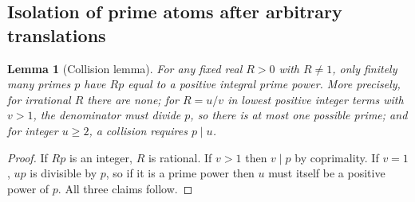 \documentclass[11pt]{article}
\newtheorem{lemma}[theorem]{Lemma}
\theoremstyle{remark}\newtheorem{remark}[theorem]{Remark}
\begin{document}
\subsection{Isolation of prime atoms after arbitrary translations}
\begin{lemma}[Collision lemma]\label{lem:collision}
For any fixed real $R>0$ with $R\ne1$, only finitely many primes $p$ have $Rp$ equal to a positive integral prime power. More precisely, for irrational $R$ there are none; for $R=u/v$ in lowest positive integer terms with $v>1$, the denominator must divide $p$, so there is at most one possible prime; and for integer $u\ge2$, a collision requires $p\mid u$.
\end{lemma}
\begin{proof}
If $Rp$ is an integer, $R$ is rational. If $v>1$ then $v\mid p$ by coprimality. If $v=1$, $up$ is divisible by $p$, so if it is a prime power then $u$ must itself be a positive power of $p$. All three claims follow.
\end{proof}
\end{document}
